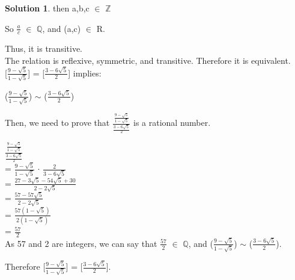 \documentclass{article}
\theoremstyle{definition}
\newtheorem*{solution}{Solution}
\begin{document}
\begin{solution}
then a,b,c \(\in\) \(\mathbb{Z}\)

So \(\frac{a}{c}\) \(\in\) \(\mathbb{Q}\), and (a,c) \(\in\) R.

Thus, it is transitive.\\

The relation is reflexive, symmetric, and transitive. Therefore it is equivalent.\\


[\(\frac{9-\sqrt{5}}{1-\sqrt{5}}\)] = [\(\frac{3-6\sqrt{5}}{2}\)] implies:

(\(\frac{9-\sqrt{5}}{1-\sqrt{5}}\)) \(\sim\) (\(\frac{3-6\sqrt{5}}{2}\))

Then, we need to prove that \(\frac{\frac{9-\sqrt{5}}{1-\sqrt{5}}}{\frac{3-6\sqrt{5}}{2}}\) is a rational number.

 \(\frac{\frac{9-\sqrt{5}}{1-\sqrt{5}}}{\frac{3-6\sqrt{5}}{2}}\)\\
 
 = \(\frac{9-\sqrt{5}}{1-\sqrt{5}}\) \(\cdot\) \(\frac{2}{3-6\sqrt{5}}\)\\
 
 = \(\frac{27-3\sqrt{5}-54\sqrt{5}+30}{2-2\sqrt{5}}\)\\
 
 = \(\frac{57-57\sqrt{5}}{2-2\sqrt{5}}\)\\
 
 = \(\frac{57(1-\sqrt{5})}{2(1-\sqrt{5})}\)\\
 
 = \(\frac{57}{2}\)\\
 
As 57 and 2 are integers, we can say that \(\frac{57}{2}\) \(\in\) \(\mathbb{Q}\), and (\(\frac{9-\sqrt{5}}{1-\sqrt{5}}\)) \(\sim\) (\(\frac{3-6\sqrt{5}}{2}\)).

Therefore [\(\frac{9-\sqrt{5}}{1-\sqrt{5}}\)] = [\(\frac{3-6\sqrt{5}}{2}\)].\\\\\\

























	


\end{solution}
\end{document}
